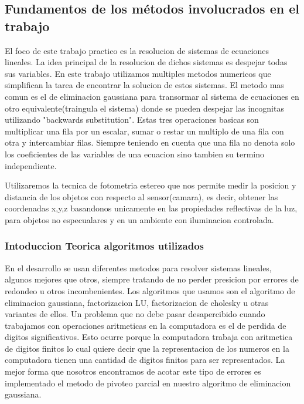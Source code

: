 \subsection{Fundamentos de los m\'etodos involucrados en el trabajo}


El foco de este trabajo practico es la resolucion de sistemas de ecuaciones lineales. La idea principal de la resolucion de dichos sistemas es despejar todas sus variables. 
En este trabajo utilizamos multiples metodos numericos que simplifican la tarea de encontrar la solucion de estos sistemas. 
El metodo mas comun es el de eliminacion gaussiana para transormar al sistema de ecuaciones en otro equivalente(traingula el sistema) donde se pueden despejar las incognitas utilizando "backwards substitution". 
Estas tres operaciones basicas son multiplicar una fila por un escalar, sumar o restar un multiplo de una fila con otra y intercambiar filas. Siempre teniendo en cuenta que una fila no denota solo los coeficientes de las variables de una ecuacion sino tambien su termino independiente.



Utilizaremos la tecnica de fotometria estereo que nos permite medir la posicion y distancia de los objetos con respecto al sensor(camara), es decir, obtener las coordenadas x,y,z basandonos unicamente en las propiedades reflectivas de la luz, para objetos no especualares y en un ambiente con iluminacion controlada.


\subsubsection{Intoduccion Teorica algoritmos utilizados}

En el desarrollo se usan diferentes metodos para resolver sistemas lineales, algunos mejores que otros, siempre tratando de no perder presicion por errores de redondeo u otros incombenientes.
Los algoritmos que usamos son el algoritmo de eliminacion gaussiana, factorizacion LU, factorizacion de cholesky u otras variantes de ellos.
Un problema que no debe pasar desapercibido cuando trabajamos con operaciones aritmeticas en la computadora es el de perdida de digitos significativos. Esto ocurre porque la computadora trabaja con aritmetica de digitos finitos lo cual quiere decir que la representacion de los numeros en la computadora tienen una cantidad de digitos finitos para ser representados.
La mejor forma que nosotros encontramos de acotar este tipo de errores es implementado el metodo de pivoteo parcial en nuestro algoritmo de eliminacion gaussiana.

